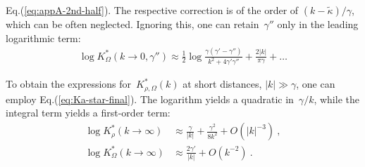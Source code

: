 \documentclass[preprint,aps,eqsecnum, prb]{revtex4-1}
\begin{document}
Eq.(\ref{eq:appA-2nd-half}).
The respective
correction is of the order of $(k - \tilde{\kappa})/\gamma$, which
can be often neglected. Ignoring this, one can retain~$\gamma''$
only in the leading logarithmic term:
\begin{align}
  \log  K_\Omega^\ast(k\to 0, \gamma'')
  \approx \frac{1}{2} \log\frac{\gamma (\gamma' - \gamma'')}{k^2
  + 4\gamma'\gamma''} + \frac{2|k|}{\pi\gamma} + \ldots
\end{align}

To obtain the expressions for~$K_{\rho, \Omega}^\ast(k)$
at short distances, $|k| \gg \gamma$, one can employ
Eq.(\ref{eq:Ka-star-final}).
The logarithm yields a quadratic in~$\gamma/k$,
while the integral term yields a first-order term:
\begin{align}
  \label{eq:kstar-k=inf}
  \log K_\rho^\ast(k \to \infty) &\approx \frac{\gamma}{|k|}
                                   + \frac{\gamma^2}{8k^2} + O(|k|^{-3})\ ,
  \\ \nonumber
  \log K_\Omega^\ast(k\to\infty) &\approx \frac{2\gamma'}{|k|}
                                           + O(k^{-2})\ .
\end{align}

\end{document}
